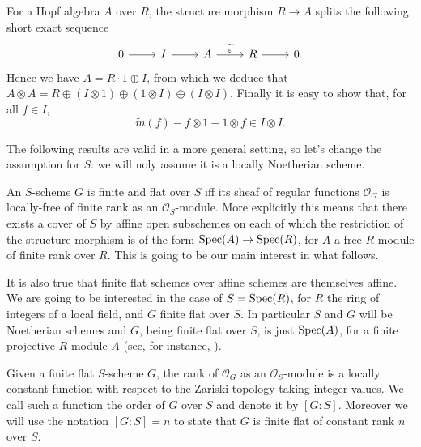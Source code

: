 \begin{defn}
	For a Hopf algebra $A$ over $R$,
	the structure morphism $R \to A$
	splits the following short exact sequence
	\begin{equation*}
	\begin{tikzcd}
		0 \arrow[r, "", rightarrow] &
		I \arrow[r, "", rightarrow] &
		A \arrow[r, "\widetilde{\varepsilon}", rightarrow] &
		R \arrow[r, "", rightarrow] &
		0.
	\end{tikzcd}
	\end{equation*}
	Hence we have $A = R \cdot 1 \oplus I$,
	from which we deduce that $A \otimes A = R \oplus \left( I \otimes 1 \right) \oplus
	\left( 1 \otimes I \right) \oplus \left( I \otimes I \right)$.
	Finally it is easy to show that, for all $f \in I$,
	\begin{equation*}
		\widetilde{m}(f) - f \otimes 1 - 1 \otimes f \in I \otimes I
	.\end{equation*} 
\end{defn}


\noindent
The following results are valid in a more general setting, so let's change
the assumption for $S$: we will noly assume it is a locally Noetherian scheme.
\begin{rem}\label{rem:finiteGSMotivation}
	An $S$-scheme $G$ is finite and flat over $S$ iff its sheaf of regular functions
	$\mathcal{O}_G$ is locally-free of finite rank as an $\mathcal{O}_S$-module.
	More explicitly this means that there exists a cover of $S$ by affine open subschemes
	on each of which the restriction of the structure morphism is of the form
	$\operatorname{Spec}(A) \to \operatorname{Spec}(R)$, for $A$ a free $R$-module of finite rank over $R$. 
	This is going to be our main interest in what follows.

	It is also true that finite flat schemes over affine schemes
	are themselves affine. 
	We are going to be interested in the case of $S = \operatorname{Spec}(R)$,
	for $R$ the ring of integers of a local field,
	and $G$ finite flat over $S$.
	In particular $S$ and $G$ will be Noetherian schemes
	and $G$, being finite flat over $S$, is just $\operatorname{Spec}(A)$,
	for a finite projective $R$-module $A$ (see, for instance, 
	\cite[\href{https://stacks.math.columbia.edu/tag/00NX}{Lemma 00NX}]{SP}).
\end{rem}


\begin{defn}
	Given a finite flat $S$-scheme $G$, the rank of $\mathcal{O}_G$ as
	an $\mathcal{O}_S$-module is a locally constant function with respect
	to the Zariski topology taking integer values.
	We call such a function the order of $G$ over $S$ and denote it by $[G:S]$.
	Moreover we will use the notation $[G:S] = n$ to state that $G$ is finite flat of
	constant rank $n$ over $S$.
\end{defn}


